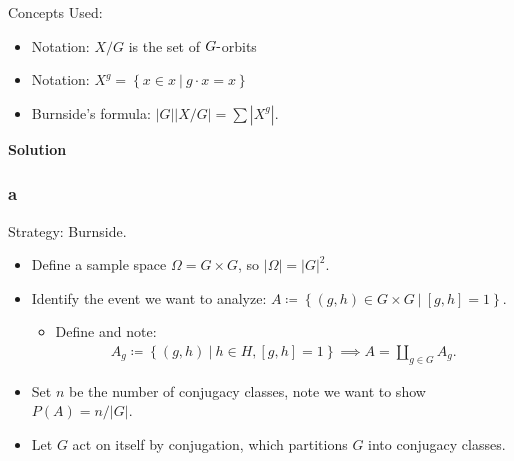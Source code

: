 \begin{solution}

Concepts Used:

\begin{itemize}
\tightlist
\item
  Notation: \(X/G\) is the set of \(G{\hbox{-}}\)orbits
\item
  Notation:
  \(X^g = \left\{{x\in x{~\mathrel{\Big|}~}g\cdot x = x}\right\}\)
\item
  Burnside's formula:
  \({\left\lvert {G} \right\rvert} {\left\lvert {X/G} \right\rvert} = \sum {\left\lvert {X^g} \right\rvert}\).
\end{itemize}

\textbf{Solution}

\hypertarget{a-1}{%
\subsubsection{a}\label{a-1}}

Strategy: Burnside.

\begin{itemize}
\item
  Define a sample space \(\Omega = G \times G\), so
  \({\left\lvert {\Omega} \right\rvert} = {\left\lvert {G} \right\rvert}^2\).
\item
  Identify the event we want to analyze:
  \(A \coloneqq\left\{{(g,h) \in G\times G {~\mathrel{\Big|}~}[g,h] = 1}\right\}\).

  \begin{itemize}
  \tightlist
  \item
    Define and note:
    \begin{align*}
    A_g \coloneqq\left\{{(g, h) {~\mathrel{\Big|}~}h\in H, [g, h] = 1}\right\} \implies A = {\coprod}_{g\in G} A_g
    .\end{align*}
  \end{itemize}
\item
  Set \(n\) be the number of conjugacy classes, note we want to show
  \(P(A) = n / {\left\lvert {G} \right\rvert}\).
\item
  Let \(G\) act on itself by conjugation, which partitions \(G\) into
  conjugacy classes.


\end{itemize}
\end{solution}
